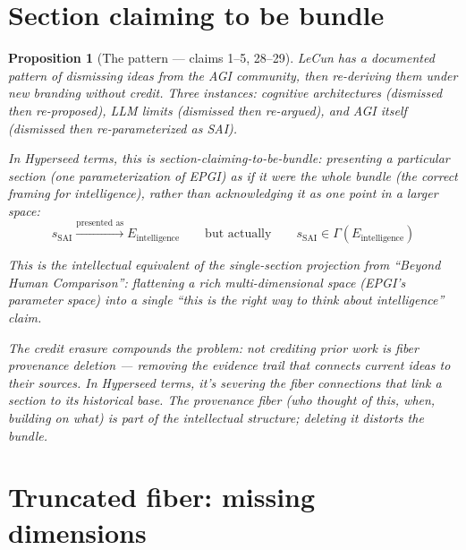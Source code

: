 \documentclass[11pt,a4paper]{article}
\newtheorem{proposition}[definition]{Proposition}
\begin{document}
\section{Section claiming to be bundle}
\label{sec:pattern}

\begin{proposition}[The pattern --- claims 1--5, 28--29]
\label{prop:pattern}
LeCun has a documented pattern of dismissing ideas from the AGI community,
then re-deriving them under new branding without credit. Three instances:
cognitive architectures (dismissed then re-proposed), LLM limits (dismissed
then re-argued), and AGI itself (dismissed then re-parameterized as SAI).

In Hyperseed terms, this is \emph{section-claiming-to-be-bundle}:
presenting a particular section (one parameterization of EPGI) as if
it were the whole bundle (the correct framing for intelligence), rather
than acknowledging it as one point in a larger space:
\[
  s_{\text{SAI}} \xrightarrow{\text{presented as}} E_{\text{intelligence}}
  \qquad \text{but actually} \qquad
  s_{\text{SAI}} \in \Gamma(E_{\text{intelligence}})
\]

This is the intellectual equivalent of the single-section projection from
``Beyond Human Comparison'': flattening a rich multi-dimensional space
(EPGI's parameter space) into a single ``this is the right way to think
about intelligence'' claim.

The credit erasure compounds the problem: not crediting prior work is
\emph{fiber provenance deletion} --- removing the evidence trail that
connects current ideas to their sources. In Hyperseed terms, it's
severing the fiber connections that link a section to its historical
base. The provenance fiber (who thought of this, when, building on what)
is part of the intellectual structure; deleting it distorts the bundle.
\end{proposition}

\section{Truncated fiber: missing dimensions}
\label{sec:missing}
\end{document}
